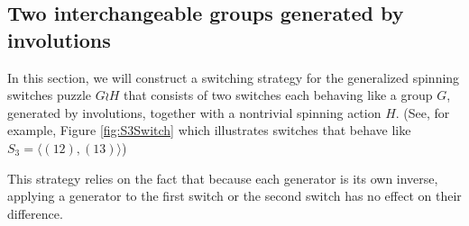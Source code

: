 \subsection{Two interchangeable groups generated by involutions}

In this section, we will construct a switching strategy for the generalized
spinning switches puzzle $G \wr H$
that consists of two switches each behaving like
a group $G$, generated by involutions, together with a nontrivial spinning
action $H$.
(See, for example, Figure \ref{fig:S3Switch} which illustrates switches that
behave like $S_3 = \langle (12), (13)\rangle$)

This strategy relies on the fact that because each generator is its own
inverse, applying a generator to the first switch or the second switch
has no effect on their difference.

